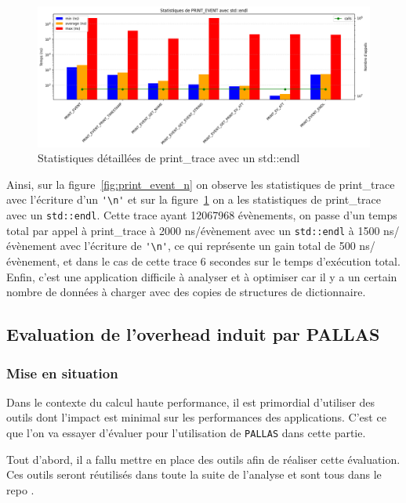 \begin{figure}[!h]
    \centering
    \includegraphics[width=1\textwidth]{img/print_event_endl.png}
    \caption{Statistiques détaillées de print\_trace avec un std::endl}
    \label{fig:print_event_endl}
\end{figure}

Ainsi, sur la figure~\ref{fig:print_event_n} on observe les statistiques de print\_trace avec l'écriture d'un \verb!'\n'! et sur la figure~\ref{fig:print_event_endl} on a les statistiques de print\_trace avec un \verb!std::endl!.
Cette trace ayant 12067968 évènements, on passe d'un temps total par appel à print\_trace à 2000 ns/évènement avec un \verb!std::endl! à 1500 ns/évènement avec l'écriture de \verb!'\n'!, ce qui représente un gain
total de 500 ns/évènement, et dans le cas de cette trace 6 secondes sur le temps d'exécution total.\\
Enfin, c'est une application difficile à analyser et à optimiser car il y a un certain nombre de données à charger avec des copies de structures de dictionnaire.


\subsection{Evaluation de l'overhead induit par PALLAS}\label{ssec:overhead}
\subsubsection{Mise en situation}\label{ssec:overhead_context}

Dans le contexte du calcul haute performance, il est primordial d'utiliser des outils dont l'impact est minimal sur les performances des applications.
C'est ce que l'on va essayer d'évaluer pour l'utilisation de \verb!PALLAS! dans cette partie.

Tout d'abord, il a fallu mettre en place des outils afin de réaliser cette évaluation. Ces outils seront réutilisés dans toute la suite de l'analyse et sont tous dans le repo \cite{pallas-analysis}.


